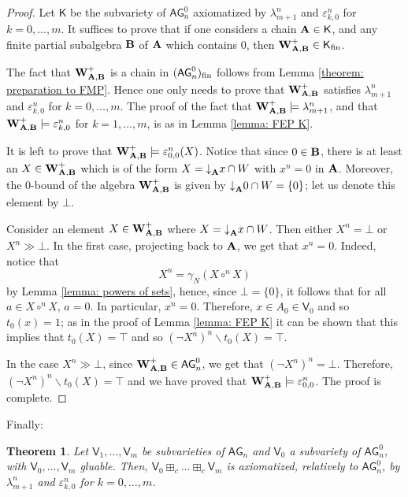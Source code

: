 \documentclass{amsart}
\newtheorem{theorem}{Theorem}[section]
\theoremstyle{definition}
\numberwithin{equation}{section}
\newcommand{\alg}[1]{{\textbf{\upshape #1}}}  %
\newcommand{\vv}[1]{\mathsf {#1}}
\newcommand{\BG}{\vv{AG}}
\begin{document}
\begin{proof}
Let $\vv K$ be the subvariety of $\BG_n^0$ axiomatized by $\lambda_{m+1}^n$ and $\varepsilon_{k,0}^n$ for $k=0, \dots, m$.
It suffices to prove that if one considers a chain $\alg A\in \vv K$, and any finite partial subalgebra $\alg B$ of $\alg A$ which contains $0$, then $\alg W_{\alg A, \alg B}^+ \in \vv K_{\rm fin}$. 

	The fact that $\alg W_{\alg A, \alg B}^+$ is a chain in $(\BG_n^0)_{\rm fin}$ follows from Lemma \ref{theorem: preparation to FMP}. Hence one only needs to prove that $\alg W_{\alg A, \alg B}^+$ satisfies $\lambda_{m+1}^n$ and $\varepsilon_{k,0}^n$ for $k=0, \dots, m$. 
	The proof of the fact that $\alg W_{\alg A, \alg B}^+ \models \lambda_{m+1}^n$, and that $\alg W_{\alg A, \alg B}^+ \models \varepsilon_{k,0}^n$ for $k=1, \dots, m$, is as in Lemma \ref{lemma: FEP K}.
	
	It is left to prove that $\alg W_{\alg A, \alg B}^+\models \varepsilon_{0,0}^n(X)$.	
	Notice that since $0 \in \alg B$, there is at least an $X \in \alg W_{\alg A, \alg B}^+$ which is of the form $X={\downarrow}_\alg A x \cap W$ with $x^n=0$ in $\alg A$. Moreover, the $0$-bound of the algebra $\alg W_{\alg A, \alg B}^+$ is given by ${\downarrow}_\alg A 0 \cap W= \{0\}$; let us denote this element by $\bot$. 
	
	Consider an element $X \in \alg W_{\alg A, \alg B}^+$ where $X={\downarrow}_\alg A x \cap W$. Then either $X^n=\bot$ or $X^n \gg \bot$. 
	In the first case, projecting back to $\alg A$, we get that $x^n=0$. Indeed, notice that $$X^n= \gamma_N(X \circ^{n} X)$$ by Lemma \ref{lemma: powers of sets}, hence, since $\bot = \{0\}$, it follows that for all $a \in X \circ^{n} X$, $a = 0$. In particular, $x^n = 0$.
	 Therefore, $x \in A_0 \in \vv V_0$ and so $t_0(x)=1$; as in the proof of Lemma \ref{lemma: FEP K} it can be shown that this implies that $t_0(X)=\top$ and so $(\neg X^n)^n \backslash t_0(X)=\top$. 
	 
	In the case $X^n \gg \bot$, since $\alg W_{\alg A, \alg B}^+ \in \BG_n^0$, we get that $(\neg X^n)^n=\bot$. Therefore, $(\neg X^n)^n \backslash t_0(X)=\top$ and we have proved that $\alg W_{\alg A, \alg B}^+ \models \varepsilon_{0,0}^n$. The proof is complete.
\end{proof}
Finally:
\begin{theorem}
Let $\vv V_1, \ldots, \vv V_m$ be subvarieties of $\BG_n$ and $\vv V_0$ a subvariety of $\BG_n^0$, with $\vv V_0, \ldots, \vv V_m$  gluable.
Then, $\vv V_0 \boxplus_c \dots \boxplus_c \vv V_m$ is axiomatized, relatively to $\BG_n^0$, by $\lambda_{m+1}^n$ and $\varepsilon_{k,0}^n$ for $k=0, \dots, m$.
\end{theorem}
\end{document}
